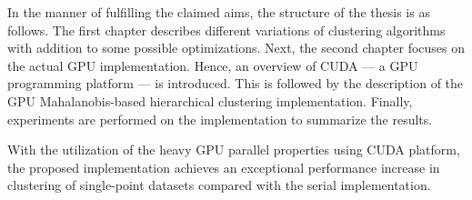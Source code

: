 In the manner of fulfilling the claimed aims, the structure of the thesis is as follows. The first chapter describes different variations of clustering algorithms with addition to some possible optimizations. Next, the second chapter focuses on the actual GPU implementation. Hence, an overview of CUDA --- a GPU programming platform --- is introduced. This is followed by the description of the GPU Mahalanobis-based hierarchical clustering implementation. Finally, experiments are performed on the implementation to summarize the results.

With the utilization of the heavy GPU parallel properties using CUDA platform, the proposed implementation achieves an exceptional performance increase in clustering of single-point datasets compared with the serial implementation.